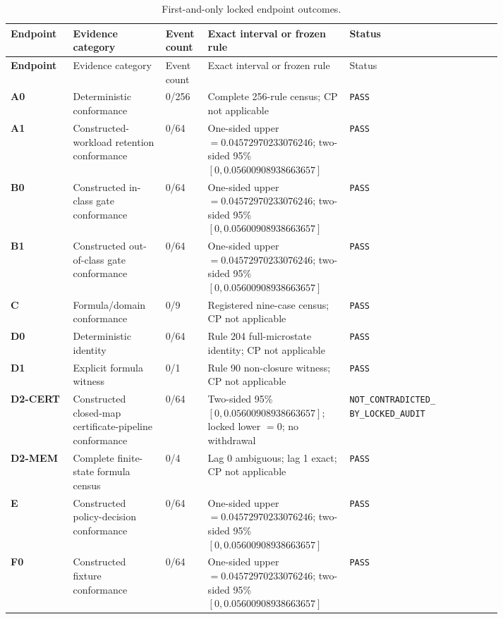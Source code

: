 \begin{longtable}{>{\bfseries}p{0.095\linewidth}p{0.145\linewidth}p{0.055\linewidth}
p{0.24\linewidth}p{0.275\linewidth}}
\caption{First-and-only locked endpoint outcomes.}\label{tab:locked-outcomes}\\
\toprule
Endpoint & Evidence category & Event count & Exact interval or frozen rule & Status\\
\midrule
\endfirsthead
\toprule
Endpoint & Evidence category & Event count & Exact interval or frozen rule & Status\\
\midrule
\endhead
A0 & Deterministic conformance & 0/256 & Complete 256-rule census; CP not applicable &
\texttt{PASS}\\
A1 & Constructed-workload retention conformance & 0/64 & One-sided upper \(=0.04572970233076246\);
two-sided 95\% \([0,0.05600908938663657]\) &
\texttt{PASS}\\
B0 & Constructed in-class gate conformance & 0/64 & One-sided upper \(=0.04572970233076246\);
two-sided 95\% \([0,0.05600908938663657]\) &
\texttt{PASS}\\
B1 & Constructed out-of-class gate conformance & 0/64 & One-sided upper \(=0.04572970233076246\);
two-sided 95\% \([0,0.05600908938663657]\) &
\texttt{PASS}\\
C & Formula/\allowbreak domain conformance & 0/9 & Registered nine-case census; CP not applicable &
\texttt{PASS}\\
D0 & Deterministic identity & 0/64 & Rule 204 full-microstate identity; CP not applicable &
\texttt{PASS}\\
D1 & Explicit formula witness & 0/1 & Rule 90 non-closure witness; CP not applicable &
\texttt{PASS}\\
D2-CERT & Constructed closed-map certificate-pipeline conformance & 0/64 & Two-sided 95\% \([0,0.05600908938663657]\);
locked lower \(=0\); no withdrawal &
\shortstack[l]{\texttt{NOT\_CONTRADICTED\_}\\\texttt{BY\_LOCKED\_AUDIT}}\\
D2-MEM & Complete finite-state formula census & 0/4 & Lag 0 ambiguous; lag 1 exact; CP not applicable &
\texttt{PASS}\\
E & Constructed policy-decision conformance & 0/64 & One-sided upper
\(=0.04572970233076246\); two-sided 95\% \([0,0.05600908938663657]\) & \texttt{PASS}\\
F0 & Constructed fixture conformance & 0/64 & One-sided upper
\(=0.04572970233076246\); two-sided 95\% \([0,0.05600908938663657]\) & \texttt{PASS}\\
\bottomrule
\end{longtable}

